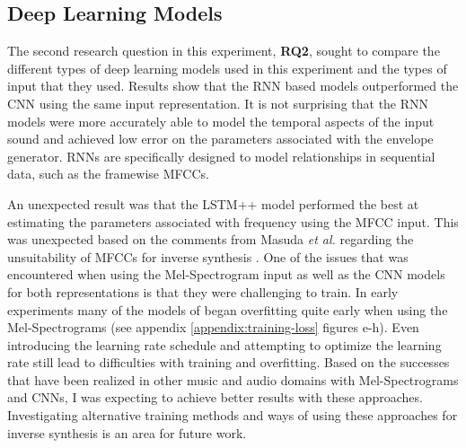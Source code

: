 \subsection{Deep Learning Models}
The second research question in this experiment, \textbf{RQ2}, sought to compare the different types of deep learning models used in this experiment and the types of input that they used. Results show that the RNN based models outperformed the CNN using the same input representation. It is not surprising that the RNN models were more accurately able to model the temporal aspects of the input sound and achieved low error on the parameters associated with the envelope generator. RNNs are specifically designed to model relationships in sequential data, such as the framewise MFCCs. 

An unexpected result was that the LSTM++ model performed the best at estimating the parameters associated with frequency using the MFCC input. This was unexpected based on the comments from Masuda \textit{et al.} regarding the unsuitability of MFCCs for inverse synthesis \cite{masudo2021quality}. One of the issues that was encountered when using the Mel-Spectrogram input as well as the CNN models for both representations is that they were challenging to train. In early experiments many of the models of began overfitting quite early when using the Mel-Spectrograms (see appendix \ref{appendix:training-loss} figures e-h). Even introducing the learning rate schedule and attempting to optimize the learning rate  still lead to difficulties with training and overfitting. Based on the successes that have been realized in other music and audio domains with Mel-Spectrograms and CNNs, I was expecting to achieve better results with these approaches. Investigating alternative training methods and ways of using these approaches for inverse synthesis is an area for future work.


